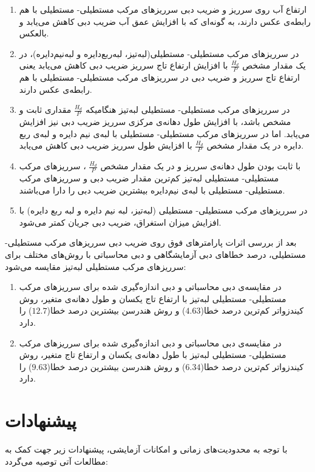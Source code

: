 \begin{enumerate}
\item  
		ارتفاع آب روی سرریز و ضریب دبی سرریزهای مرکب مستطیلی- مستطیلی  با هم رابطه‌ی عکس دارند، به گونه‌ای که با افزایش عمق آب ضریب دبی کاهش می‌یابد و بالعکس.
\item 
	در سرریزهای مرکب مستطیلی- مستطیلی(لبه‌تیز، لبه‌ربع‌دایره و لبه‌نیم‌دایره)، در یک مقدار مشخص     $\frac{H_d}{P}$    با افزایش ارتفاع تاج سرریز ضریب دبی کاهش می‌یابد یعنی ارتفاع تاج سرریز و ضریب دبی در سرریزهای مرکب مستطیلی- مستطیلی با هم رابطه‌ی عکس دارند.
\item
	در سرریزهای مرکب مستطیلی- مستطیلی لبه‌تیز هنگامیکه         $\frac{H_d}{P}$     مقداری ثابت و مشخص باشد، با افزایش طول دهانه‌ی مرکزی سرریز ضریب دبی نیز افزایش می‌یابد. اما در سرریزهای مرکب مستطیلی- مستطیلی با لبه‌ی نیم دایره و لبه‌ی ربع دایره در یک مقدار مشخص  $\frac{H_d}{P}$ با افزایش طول سرریز ضریب دبی کاهش می‌یابد.
\item

	با ثابت بودن طول دهانه‌ی سرریز و در یک مقدار مشخص       $\frac{H_d}{P}$     ، سرریزهای مرکب مستطیلی- مستطیلی لبه‌تیز کم‌ترین مقدار ضریب دبی و سرریزهای مرکب مستطیلی- مستطیلی با لبه‌ی نیم‌دایره بیشترین ضریب دبی را دارا می‌باشند.

\item
در سرریزهای مرکب مستطیلی- مستطیلی (لبه‌تیز، لبه نیم دایره و لبه ربع دایره) با افزایش میزان استغراق، ضریب دبی جریان کمتر می‌شود.
\end{enumerate}
بعد از بررسی اثرات پارامترهای فوق روی ضریب دبی سرریزهای مرکب مستطیلی- مستطیلی، درصد خطاهای دبی آزمایشگاهی و دبی محاسباتی با روش‌های مختلف برای سرریزهای مرکب مستطیلی لبه‌تیز مقایسه می‌شود:
\begin{enumerate}
\item
در مقایسه‌ی دبی محاسباتی و دبی اندازه‌گیری شده برای سرریزهای مرکب مستطیلی- مستطیلی لبه‌تیز با ارتفاع تاج یکسان و طول دهانه‌ی متغیر، روش کیندزواتر کم‌ترین درصد خطا($4.63$) و روش هندرسن بیشترین درصد خطا($12.7$) را دارد.
\item
	در مقایسه‌ی دبی محاسباتی و دبی اندازه‌گیری شده برای سرریزهای مرکب مستطیلی- مستطیلی لبه‌تیز با طول دهانه‌ی یکسان و ارتفاع تاج متغیر، روش کیندزواتر کم‌ترین درصد خطا($6.34$) و روش هندرسن بیشترین درصد خطا($9.63$) را دارد.

\end{enumerate}

\section{پیشنهادات}
با توجه به محدودیت‌های زمانی و امکانات آزمایشی، پیشنهادات زیر جهت کمک به مطالعات آتی توصیه می‌گردد:

